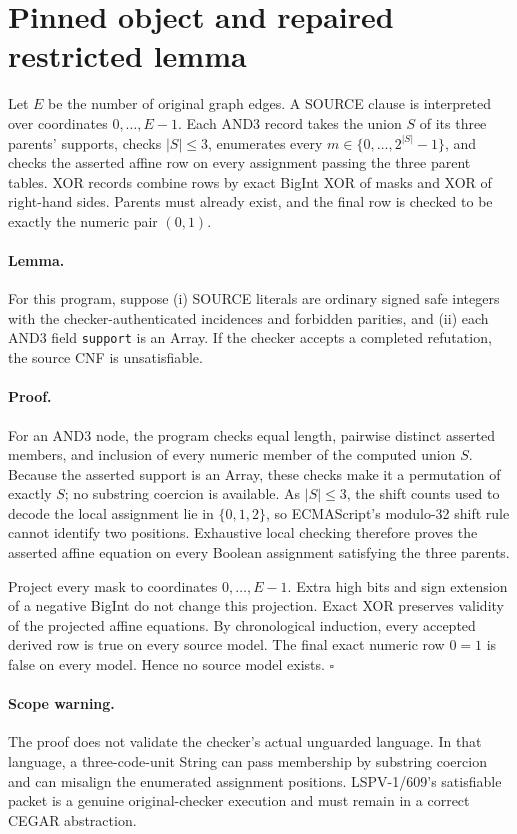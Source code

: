 \documentclass[11pt]{article}
\begin{document}
\section*{Pinned object and repaired restricted lemma}
Let $E$ be the number of original graph edges.  A SOURCE clause is interpreted
over coordinates $0,\ldots,E-1$.  Each AND3 record takes the union $S$ of its
three parents' supports, checks $|S|\leq 3$, enumerates every
$m\in\{0,\ldots,2^{|S|}-1\}$, and checks the asserted affine row on every
assignment passing the three parent tables.  XOR records combine rows by exact
BigInt XOR of masks and XOR of right-hand sides.  Parents must already exist,
and the final row is checked to be exactly the numeric pair $(0,1)$.

\paragraph{Lemma.}
For this program, suppose (i) SOURCE literals are ordinary signed safe integers
with the checker-authenticated incidences and forbidden parities, and (ii) each
AND3 field \texttt{support} is an Array.  If the checker accepts a completed
refutation, the source CNF is unsatisfiable.

\paragraph{Proof.}
For an AND3 node, the program checks equal length, pairwise distinct asserted
members, and inclusion of every numeric member of the computed union $S$.
Because the asserted support is an Array, these checks make it a permutation of
exactly $S$; no substring coercion is available.  As $|S|\leq3$, the shift
counts used to decode the local assignment lie in $\{0,1,2\}$, so ECMAScript's
modulo-32 shift rule cannot identify two positions.  Exhaustive local checking
therefore proves the asserted affine equation on every Boolean assignment
satisfying the three parents.

Project every mask to coordinates $0,\ldots,E-1$.  Extra high bits and sign
extension of a negative BigInt do not change this projection.  Exact XOR
preserves validity of the projected affine equations.  By chronological
induction, every accepted derived row is true on every source model.  The final
exact numeric row $0=1$ is false on every model.  Hence no source model exists.
\hfill$\square$

\paragraph{Scope warning.}
The proof does not validate the checker's actual unguarded language.  In that
language, a three-code-unit String can pass membership by substring coercion
and can misalign the enumerated assignment positions.  LSPV-1/609's satisfiable
packet is a genuine original-checker execution and must remain in a correct
CEGAR abstraction.
\end{document}
